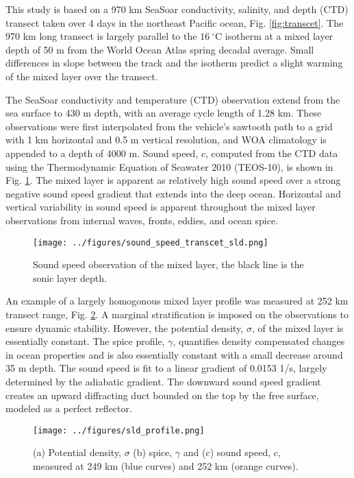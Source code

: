 \documentclass[preprint,NumberedRefs]{JASA}
\begin{document}
This study is based on a 970 km SeaSoar conductivity, salinity, and depth (CTD) transect taken over 4 days in the northeast Pacific ocean\citep{cole2010seasonal}, Fig. \ref{fig:transcet}. The 970 km long transect is largely parallel to the $16 \ ^\circ$C isotherm at a mixed layer depth of 50 m from the World Ocean Atlas spring decadal average\citep{WOA}. Small differences in slope between the track and the isotherm predict a slight warming of the mixed layer over the transect.

The SeaSoar conductivity and temperature (CTD) observation\citep{colosi2020observations} extend from the sea surface to 430 m depth, with an average cycle length of 1.28 km. These observations were first interpolated from the vehicle's sawtooth path to a grid with 1 km horizontal and 0.5 m vertical resolution, and WOA climatology is appended to a depth of 4000 m\citep{WOA}. Sound speed, $c$, computed from the CTD data using the Thermodynamic Equation of Seawater 2010 (TEOS-10), is shown in Fig. \ref{fig:c_grid}. The mixed layer is apparent as relatively high sound speed over a strong negative sound speed gradient that extends into the deep ocean. Horizontal and vertical variability in sound speed is apparent throughout the mixed layer observations from internal waves, fronts, eddies, and ocean spice\citep{colosi2020observations}.

\begin{figure}
\texttt{[image: ../figures/sound\_speed\_transcet\_sld.png]}
\caption{\label{fig:c_grid}{Sound speed observation of the mixed layer, the black line is the sonic layer depth.}}
\end{figure}

An example of a largely homogonous mixed layer profile was measured at 252 km transect range, Fig. \ref{fig:profiles}. A marginal stratification is imposed on the observations to ensure dynamic stability\citep{barker2017stabilizing}. However, the potential density, $\sigma$, of the mixed layer is essentially constant. The spice profile, $\gamma$, quantifies density compensated changes in ocean properties and is also essentially constant with a small decrease around 35 m depth. The sound speed is fit to a linear gradient of 0.0153 1/s, largely determined by the adiabatic gradient. The downward sound speed gradient creates an upward diffracting duct bounded on the top by the free surface, modeled as a perfect reflector.

\begin{figure}
\texttt{[image: ../figures/sld\_profile.png]}
    \caption{\label{fig:profiles}{(a) Potential density, $\sigma$ (b) spice, $\gamma$ and (c) sound speed, $c$, measured at 249 km (blue curves) and 252 km (orange curves).}}
\end{figure}
\end{document}
